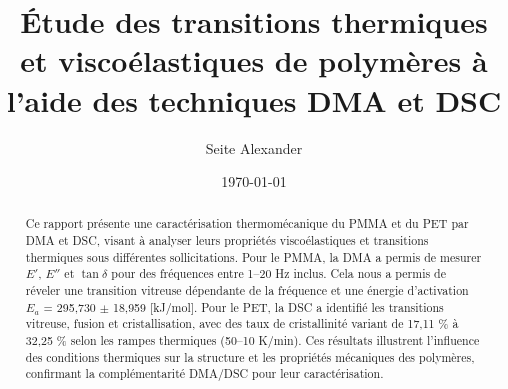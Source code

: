 \documentclass[letterpaper,12pt]{article}
\begin{document}
\title{Étude des transitions thermiques et viscoélastiques de polymères à l’aide des techniques DMA et DSC}
\author{Seite Alexander}
\date{\today}
\maketitle
\newline


\begin{abstract}
	Ce rapport présente une caractérisation thermomécanique du PMMA et du PET par DMA et DSC, visant à analyser leurs propriétés viscoélastiques et transitions thermiques sous différentes sollicitations. Pour le PMMA, la DMA a permis de mesurer $E'$, $E''$ et $\tan\delta$ pour des fréquences entre 1–20 Hz inclus. Cela nous a permis de réveler une transition vitreuse dépendante de la fréquence et une énergie d’activation $E_a$ = 295,730 $\pm$ 18,959 [kJ/mol]. Pour le PET, la DSC a identifié les transitions vitreuse, fusion et cristallisation, avec des taux de cristallinité variant de 17,11 \% à 32,25 \% selon les rampes thermiques (50–10 K/min). Ces résultats illustrent l’influence des conditions thermiques sur la structure et les propriétés mécaniques des polymères, confirmant la complémentarité DMA/DSC pour leur caractérisation.
\end{abstract}

\tableofcontents

\newpage
















\end{document}
